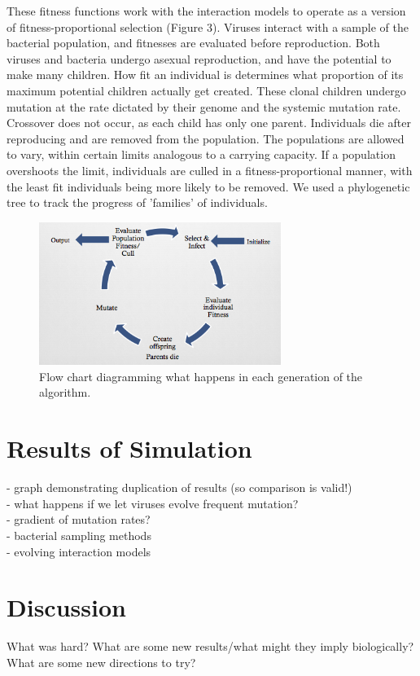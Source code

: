 \documentclass[11pt, oneside]{article}
\begin{document}
These fitness functions work with the interaction models to operate as a version of fitness-proportional selection (Figure 3). Viruses interact with a sample of the bacterial population, and fitnesses are evaluated before reproduction. Both viruses and bacteria undergo asexual reproduction, and have the potential to make many children. How fit an individual is determines what proportion of its maximum potential children actually get created. These clonal children undergo mutation at the rate dictated by their genome and the systemic mutation rate. Crossover does not occur, as each child has only one parent. Individuals die after reproducing and are removed from the population. The populations are allowed to vary, within certain limits analogous to a carrying capacity. If a population overshoots the limit, individuals are culled in a fitness-proportional manner, with the least fit individuals being more likely to be removed. We used a phylogenetic tree to track the progress of 'families' of individuals.

\begin{figure}[H]
	\centering
	\includegraphics[width=0.7\textwidth]{flowchart.png}
	\caption{Flow chart diagramming what happens in each generation of the algorithm.}
\end{figure}

\section{Results of Simulation}
- graph demonstrating duplication of results (so comparison is valid!)
\\- what happens if we let viruses evolve frequent mutation?
\\- gradient of mutation rates?
\\- bacterial sampling methods
\\- evolving interaction models

\section{Discussion}
What was hard? What are some new results/what might they imply biologically? What are some new directions to try?
\end{document}
